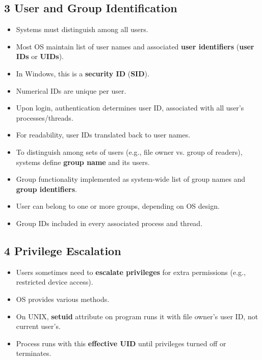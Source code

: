 \documentclass{article}
\begin{document}
\subsection*{3 User and Group Identification}
\begin{itemize}
    \item Systems must distinguish among all users.
    \item Most OS maintain list of user names and associated \textbf{user identifiers} (\textbf{user IDs} or \textbf{UIDs}).
    \item In Windows, this is a \textbf{security ID} (\textbf{SID}).
    \item Numerical IDs are unique per user.
    \item Upon login, authentication determines user ID, associated with all user's processes/threads.
    \item For readability, user IDs translated back to user names.
    \item To distinguish among sets of users (e.g., file owner vs. group of readers), systems define \textbf{group name} and its users.
    \item Group functionality implemented as system-wide list of group names and \textbf{group identifiers}.
    \item User can belong to one or more groups, depending on OS design.
    \item Group IDs included in every associated process and thread.
\end{itemize}

\subsection*{4 Privilege Escalation}
\begin{itemize}
    \item Users sometimes need to \textbf{escalate privileges} for extra permissions (e.g., restricted device access).
    \item OS provides various methods.
    \item On UNIX, \textbf{setuid} attribute on program runs it with file owner's user ID, not current user's.
    \item Process runs with this \textbf{effective UID} until privileges turned off or terminates.
\end{itemize}
\end{document}
